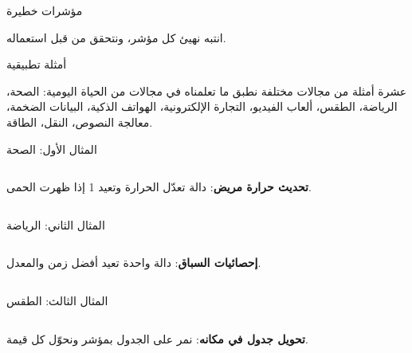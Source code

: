 \documentclass[aspectratio=169, 11pt, t, xcolor={table}]{beamer}
\begin{document}
\begin{frame}{مؤشرات خطيرة}
    \begin{center}
    \begin{minipage}{0.7\textwidth}
    \end{minipage}
    \end{center}
    \begin{obox}{\faExclamationTriangle\quad انتبه}
        نهيئ كل مؤشر، ونتحقق من  قبل استعماله.
    \end{obox}
\end{frame}

\begin{frame}{أمثلة تطبيقية}
    \begin{tbox}{\faLaptopCode\quad عشرة أمثلة من مجالات مختلفة}
        نطبق ما تعلمناه في مجالات من الحياة اليومية:
        الصحة، الرياضة، الطقس، ألعاب الفيديو، التجارة الإلكترونية، الهواتف الذكية، البيانات الضخمة، معالجة النصوص، النقل، الطاقة.
    \end{tbox}
\end{frame}

\begin{frame}[t]{المثال الأول: الصحة}
    \begin{columns}[T]
        {\small \textbf{تحديث حرارة مريض}: دالة تعدّل الحرارة وتعيد 1 إذا ظهرت الحمى.\par}
        \vspace{0.3cm}
    \end{columns}
\end{frame}

\begin{frame}[t]{المثال الثاني: الرياضة}
    \begin{columns}[T]
        {\small \textbf{إحصائيات السباق}: دالة واحدة تعيد أفضل زمن والمعدل.\par}
        \vspace{0.3cm}
    \end{columns}
\end{frame}

\begin{frame}[t]{المثال الثالث: الطقس}
    \begin{columns}[T]
        {\small \textbf{تحويل جدول في مكانه}: نمر على الجدول بمؤشر ونحوّل كل قيمة.\par}
        \vspace{0.3cm}
    \end{columns}
\end{frame}
\end{document}
